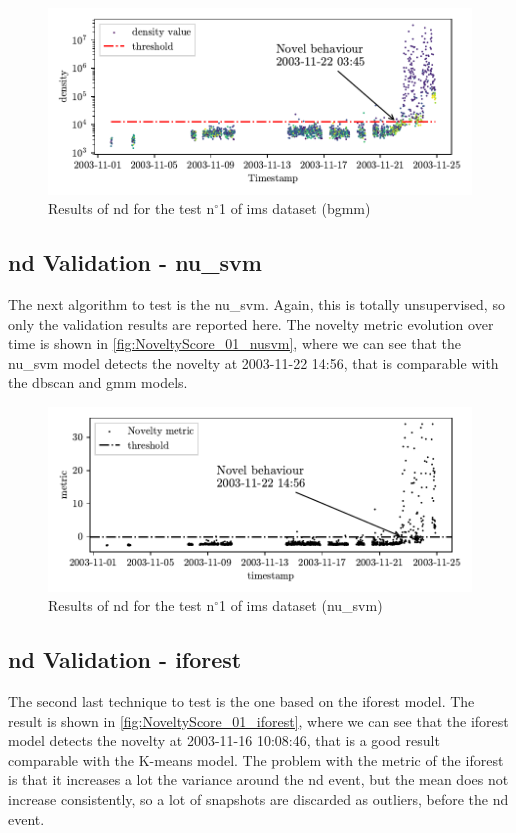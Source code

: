 \begin{figure}
    \centering
    \includegraphics{images/IMS/Novelty_01_500samples_bearing3x_GMM_bayesan.pdf}
    \caption{Results of \gls{nd} for the test $\text{n}^\circ$1 of \gls{ims} dataset (\gls{bgmm})}
    \label{fig:NoveltyScore_01_bgmm}
\end{figure}

\subsection{\gls{nd} Validation - \gls{nu_svm}}
The next algorithm to test is the \gls{nu_svm}. Again, this is totally unsupervised, so only the validation results are reported here. The novelty metric evolution over time is shown in \autoref{fig:NoveltyScore_01_nusvm}, where we can see that the \gls{nu_svm} model detects the novelty at 2003-11-22 14:56, that is comparable with the \gls{dbscan} and \gls{gmm} models.

\begin{figure}
    \centering
    \includegraphics{images/IMS/Novelty_01_500samples_bearing3x_nusvm.pdf}
    \caption{Results of \gls{nd} for the test $\text{n}^\circ$1 of \gls{ims} dataset (\gls{nu_svm})}
    \label{fig:NoveltyScore_01_nusvm}
\end{figure}

\subsection{\gls{nd} Validation - \gls{iforest}}
The second last technique to test is the one based on the \gls{iforest} model. The result is shown in \autoref{fig:NoveltyScore_01_iforest}, where we can see that the \gls{iforest} model detects the novelty at 2003-11-16 10:08:46, that is a good result comparable with the K-means model. The problem with the metric of the \gls{iforest} is that it increases a lot the variance around the \gls{nd} event, but the mean does not increase consistently, so a lot of snapshots are discarded as outliers, before the \gls{nd} event. 

